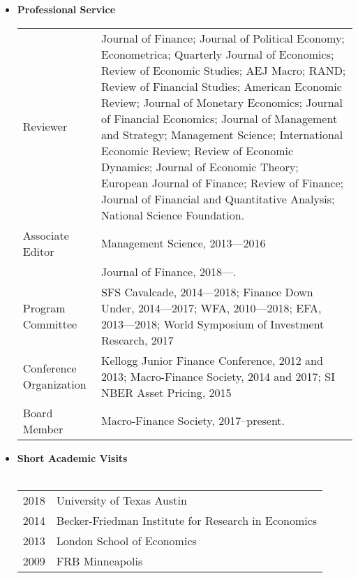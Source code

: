 \documentclass[12pt,letterpaper,serif,overlapped]{res}
\begin{document}
\begin{resume}
\begin{itemize}
\item \textbf{Professional Service} \\





 \begin{tabular}{lp{11.5cm}}
Reviewer&
Journal of Finance; Journal of Political Economy; Econometrica; Quarterly Journal of Economics; Review of Economic Studies; AEJ Macro; RAND;  Review of Financial Studies; American Economic Review;  Journal of Monetary Economics; Journal of Financial Economics; Journal of Management and Strategy; Management Science;  International Economic Review; Review of Economic Dynamics;   Journal of Economic Theory;   European Journal of Finance;   Review of Finance; Journal of Financial and Quantitative Analysis; National Science Foundation.\\[0.2cm]
Associate Editor & Management Science, 2013---2016\\[0.2cm]
  & Journal of Finance, 2018---.\\[0.2cm]

Program Committee & SFS Cavalcade, 2014---2018; Finance Down Under,   2014---2017;  WFA,  2010---2018; EFA, 2013---2018; World Symposium of Investment Research, 2017 \\[0.2cm]
Conference Organization & Kellogg Junior Finance Conference,  2012 and 2013;  Macro-Finance Society, 2014 and 2017; SI NBER Asset Pricing, 2015\\[0.2cm]
Board Member & Macro-Finance Society, 2017--present.
\\
 \end{tabular}



\clearpage


\vspace{0.5cm}
\item \textbf{Short Academic Visits} \\ \\
\begin{tabular}{lp{15cm}}
2018 & University of Texas Austin\\
2014  & Becker-Friedman Institute for Research in Economics \\
2013  & London  School of Economics\\
2009  & FRB Minneapolis
\end{tabular}
\vspace{0.5cm}




\end{itemize}
\end{resume}
\end{document}

